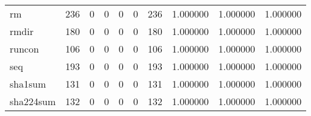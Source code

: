 \begin{tabular}{lrrrrrrrrr}
rm        &                                                236 &                                                  0 &                                                  0 &                                                  0 &                                                  0 &                                                236 &                                           1.000000 &                               1.000000 &                             1.000000 \\
rmdir     &                                                180 &                                                  0 &                                                  0 &                                                  0 &                                                  0 &                                                180 &                                           1.000000 &                               1.000000 &                             1.000000 \\
runcon    &                                                106 &                                                  0 &                                                  0 &                                                  0 &                                                  0 &                                                106 &                                           1.000000 &                               1.000000 &                             1.000000 \\
seq       &                                                193 &                                                  0 &                                                  0 &                                                  0 &                                                  0 &                                                193 &                                           1.000000 &                               1.000000 &                             1.000000 \\
sha1sum   &                                                131 &                                                  0 &                                                  0 &                                                  0 &                                                  0 &                                                131 &                                           1.000000 &                               1.000000 &                             1.000000 \\
sha224sum &                                                132 &                                                  0 &                                                  0 &                                                  0 &                                                  0 &                                                132 &                                           1.000000 &                               1.000000 &                             1.000000 \\

\end{tabular}
